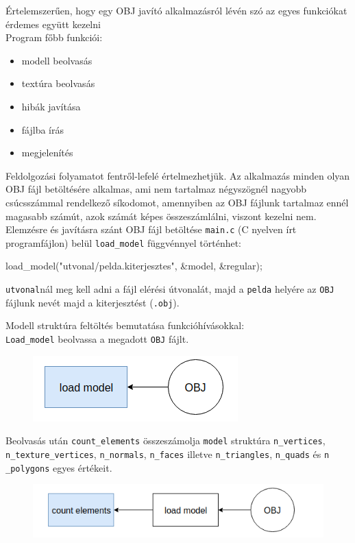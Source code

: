 Értelemszerűen, hogy egy OBJ javító alkalmazásról lévén szó az egyes funkciókat érdemes együtt  kezelni\\

Program főbb funkciói:
 \begin{itemize}
\item modell beolvasás
\item textúra beolvasás
\item hibák javítása
\item fájlba írás
\item megjelenítés
\end{itemize}
\bigskip
Feldolgozási folyamatot fentről-lefelé értelmezhetjük.
\newpage
{}
Az alkalmazás minden olyan OBJ fájl betöltésére alkalmas, ami nem tartalmaz négyszögnél nagyobb csúcsszámmal rendelkező síkodomot, amennyiben az OBJ fájlunk tartalmaz ennél magasabb számút, azok számát képes összeszámlálni, viszont kezelni nem.\\

Elemzésre és javításra szánt OBJ fájl betöltése \texttt{main.c} (C nyelven írt programfájlon) belül \texttt{load\_model} függvénnyel történhet:
\bigskip
\begin{cpp}
load_model("utvonal/pelda.kiterjesztes", &model, &regular);
\end{cpp}
\bigskip

\texttt{utvonal}nál meg kell adni a fájl elérési útvonalát, majd a \texttt{pelda} helyére az \texttt{OBJ} fájlunk nevét majd a kiterjesztést (\texttt{.obj}).
\bigskip

\noindent Modell struktúra feltöltés bemutatása funkcióhívásokkal:\\

\texttt{Load\_model} beolvassa a megadott \texttt{OBJ} fájlt.
\begin{figure}[h]
\centering
\includegraphics[scale=0.5]{images/load.png}
\end{figure}
\bigskip

Beolvasás után \texttt{count\_elements} összeszámolja \texttt{model} struktúra \texttt{n\_vertices},  \texttt{\\n\_texture\_vertices}, \texttt{n\_normals}, \texttt{n\_faces} illetve \texttt{n\_triangles}, \texttt{n\_quads} és \texttt{n\\\_polygons} egyes értékeit.
\begin{figure}[h]
\centering
\includegraphics[scale=0.5]{images/count.png}
\end{figure}
\bigskip

